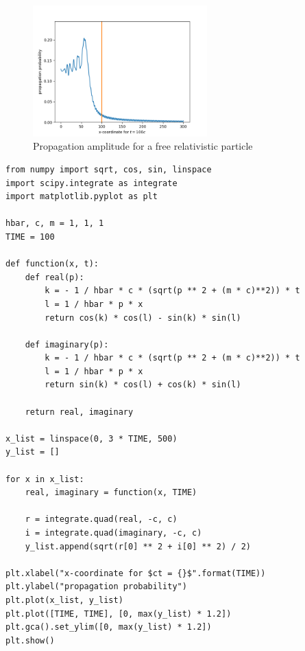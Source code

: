 \begin{figure}[h]
    \centering
    \includegraphics[width=0.6\textwidth]{free_relativistic_particle.png}
    \caption{Propagation amplitude for a free relativistic particle}
    \label{fig:free_relativistic_particle_probability}
\end{figure}

\clearpage

\begin{code}
    \label{code:free_relativistic_particle_amplitude}
    \begin{verbatim}
from numpy import sqrt, cos, sin, linspace
import scipy.integrate as integrate
import matplotlib.pyplot as plt

hbar, c, m = 1, 1, 1
TIME = 100

def function(x, t):
    def real(p):
        k = - 1 / hbar * c * (sqrt(p ** 2 + (m * c)**2)) * t
        l = 1 / hbar * p * x
        return cos(k) * cos(l) - sin(k) * sin(l)

    def imaginary(p):
        k = - 1 / hbar * c * (sqrt(p ** 2 + (m * c)**2)) * t
        l = 1 / hbar * p * x
        return sin(k) * cos(l) + cos(k) * sin(l)

    return real, imaginary

x_list = linspace(0, 3 * TIME, 500)
y_list = []

for x in x_list:
    real, imaginary = function(x, TIME)

    r = integrate.quad(real, -c, c)
    i = integrate.quad(imaginary, -c, c)
    y_list.append(sqrt(r[0] ** 2 + i[0] ** 2) / 2)

plt.xlabel("x-coordinate for $ct = {}$".format(TIME))
plt.ylabel("propagation probability")
plt.plot(x_list, y_list)
plt.plot([TIME, TIME], [0, max(y_list) * 1.2])
plt.gca().set_ylim([0, max(y_list) * 1.2])
plt.show()
    \end{verbatim}
\end{code}


